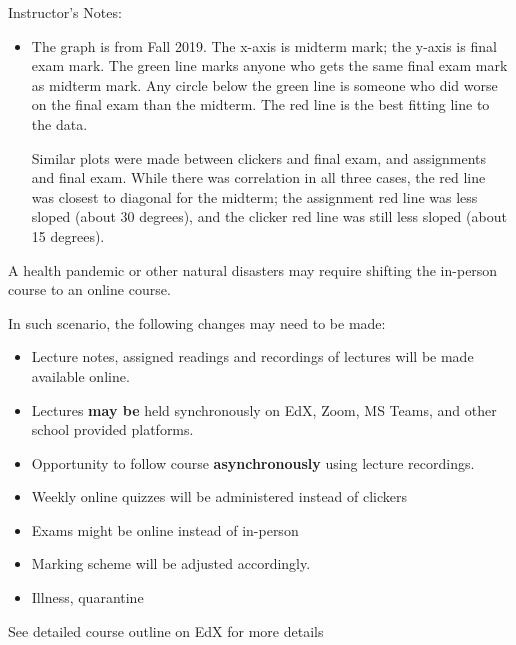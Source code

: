 \BNotes\ifnum{}
\begin{frame}[fragile]
Instructor's Notes:
\begin{itemize}
\item The graph is from Fall 2019.  The x-axis is midterm mark; the y-axis is final exam mark.  The green line marks anyone who gets the same final exam mark as midterm mark.  Any circle below the green line is someone who did worse on the final exam than the midterm.  The red line is the best fitting line to the data.

  Similar plots were made between clickers and final exam, and assignments and final exam.  While there was correlation in all three cases, the red line was closest to diagonal for the midterm; the assignment red line was less sloped (about 30 degrees), and the clicker red line was still less sloped (about 15 degrees).
\end{itemize}
\end{frame}
\fi\ENotes


\begin{frame}[fragile]
 A health pandemic or other natural disasters may require shifting the in-person course to an online course.

 In such scenario, the following changes may need to be made:
	\begin{itemize}
		\item Lecture notes, assigned readings and recordings of lectures will be made available online.
  \item Lectures\textbf{ may be} held synchronously on EdX, Zoom, MS Teams, and other school provided platforms.  
  \item Opportunity to follow course \textbf{asynchronously} using lecture recordings.

\item Weekly online quizzes will be administered instead of clickers
		\item Exams might be online instead of in-person
    \item Marking scheme will be adjusted accordingly.

		\item Illness, quarantine

	\end{itemize}
	See detailed course outline on EdX for more details
\end{frame}


